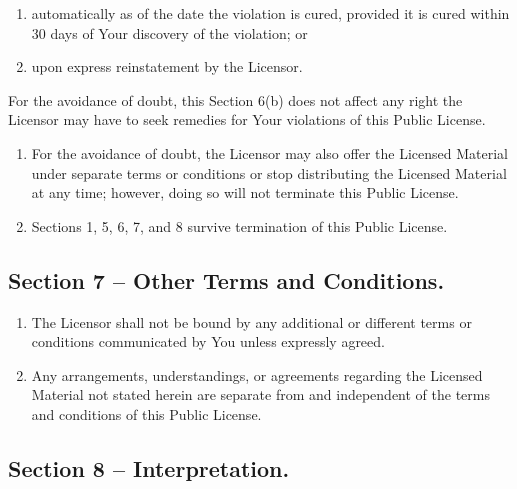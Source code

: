 \documentclass[]{book}
\begin{document}
\begin{enumerate}
\def\labelenumi{\arabic{enumi}.}
\item
  automatically as of the date the violation is cured, provided it is
  cured within 30 days of Your discovery of the violation; or
\item
  upon express reinstatement by the Licensor.
\end{enumerate}

For the avoidance of doubt, this Section 6(b) does not affect any right
the Licensor may have to seek remedies for Your violations of this
Public License.

\begin{enumerate}
\def\labelenumi{\alph{enumi}.}
\setcounter{enumi}{2}
\item
  For the avoidance of doubt, the Licensor may also offer the Licensed
  Material under separate terms or conditions or stop distributing the
  Licensed Material at any time; however, doing so will not terminate
  this Public License.
\item
  Sections 1, 5, 6, 7, and 8 survive termination of this Public License.
\end{enumerate}

\subsection{Section 7 -- Other Terms and
Conditions.}\label{section-7-other-terms-and-conditions.}

\begin{enumerate}
\def\labelenumi{\alph{enumi}.}
\item
  The Licensor shall not be bound by any additional or different terms
  or conditions communicated by You unless expressly agreed.
\item
  Any arrangements, understandings, or agreements regarding the Licensed
  Material not stated herein are separate from and independent of the
  terms and conditions of this Public License.
\end{enumerate}

\subsection{Section 8 --
Interpretation.}\label{section-8-interpretation.}
\end{document}
